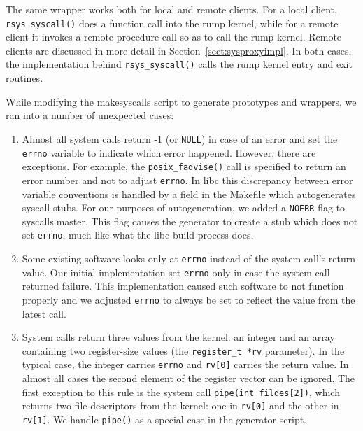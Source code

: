 The same wrapper works both for local and remote clients.  For a
local client, \verb+rsys_syscall()+ does a function call into the
rump kernel, while for a remote client it invokes a remote procedure
call so as to call the rump kernel.  Remote clients are discussed
in more detail in Section~\ref{sect:sysproxyimpl}.  In both cases,
the implementation behind \verb+rsys_syscall()+ calls the rump
kernel entry and exit routines.

While modifying the makesyscalls script to generate prototypes and
wrappers, we ran into a number of unexpected cases:

\begin{enumerate}
\item   Almost all system calls return -1 (or \texttt{NULL}) in
	case of an error and set the \texttt{errno} variable to
	indicate which error happened.  However, there are exceptions.
	For example, the
	\verb+posix_fadvise()+ call is specified to return an error number
	and not to adjust \texttt{errno}.  In libc
	this discrepancy between error variable
	conventions is handled by a field in the Makefile which
	autogenerates syscall stubs.  For our purposes of
	autogeneration, we added a \texttt{NOERR} flag to
	syscalls.master.  This flag causes the generator to create
	a stub which does not set \texttt{errno}, much like what
	the libc build process does.

\item   Some existing software looks only at \texttt{errno} instead
	of the system call's return value.  Our initial implementation
	set \texttt{errno} only in case the system call returned failure.
	This implementation caused such software to not function properly
	and we adjusted \texttt{errno} to always be set to reflect the
	value from the latest call.

\item   System calls return three values from the kernel:
	an integer and an array containing two register-size values
	(the \verb+register_t *rv+ parameter).  In the typical
	case, the integer carries \texttt{errno} and \texttt{rv[0]}
	carries the return value.  In almost all cases the second
	element of the register vector can be ignored.  The first
	exception to this rule is the system call \texttt{pipe(int
	fildes[2])}, which returns two file descriptors from
	the kernel:  one in \texttt{rv[0]} and the other in
	\texttt{rv[1]}.  We handle \texttt{pipe()} as a special
	case in the generator script.


\end{enumerate}
